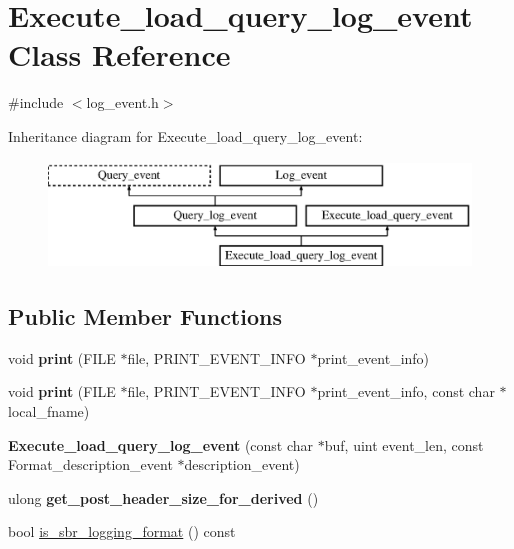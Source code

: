 \hypertarget{classExecute__load__query__log__event}{}\section{Execute\+\_\+load\+\_\+query\+\_\+log\+\_\+event Class Reference}
\label{classExecute__load__query__log__event}


{\ttfamily \#include $<$log\+\_\+event.\+h$>$}

Inheritance diagram for Execute\+\_\+load\+\_\+query\+\_\+log\+\_\+event\+:\begin{figure}[H]
\begin{center}
\leavevmode
\includegraphics[height=2.842640cm]{classExecute__load__query__log__event}
\end{center}
\end{figure}
\subsection*{Public Member Functions}
\begin{DoxyCompactItemize}
\item 
\mbox{\label{classExecute__load__query__log__event_a0712eeb774c9bdcaace5b276a5fb1ea8}} 
void {\bfseries print} (F\+I\+LE $\ast$file, P\+R\+I\+N\+T\+\_\+\+E\+V\+E\+N\+T\+\_\+\+I\+N\+FO $\ast$print\+\_\+event\+\_\+info)
\item 
\mbox{\label{classExecute__load__query__log__event_ab97f809fc7f6d33622c5270947caa166}} 
void {\bfseries print} (F\+I\+LE $\ast$file, P\+R\+I\+N\+T\+\_\+\+E\+V\+E\+N\+T\+\_\+\+I\+N\+FO $\ast$print\+\_\+event\+\_\+info, const char $\ast$local\+\_\+fname)
\item 
\mbox{\label{classExecute__load__query__log__event_ad337a7209e0888a0572fbc94a5dbda51}} 
{\bfseries Execute\+\_\+load\+\_\+query\+\_\+log\+\_\+event} (const char $\ast$buf, uint event\+\_\+len, const Format\+\_\+description\+\_\+event $\ast$description\+\_\+event)
\item 
\mbox{\label{classExecute__load__query__log__event_a3e578fcc9abcea7351cb989d441f56ef}} 
ulong {\bfseries get\+\_\+post\+\_\+header\+\_\+size\+\_\+for\+\_\+derived} ()
\item 
bool \mbox{\hyperlink{classExecute__load__query__log__event_a8980ecbe8b7f0431a201498aa245c88d}{is\+\_\+sbr\+\_\+logging\+\_\+format}} () const
\end{DoxyCompactItemize}
